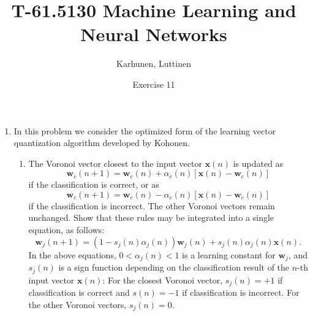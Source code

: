 
\title{T-61.5130 Machine Learning and Neural Networks}
\author{Karhunen, Luttinen}
\date{Exercise 11}

\newcommand{\vect}[1]{{\bf{#1}}}
\newcommand{\svect}[1]{\boldsymbol{#1}}
\newcommand{\matr}[1]{\boldsymbol{#1}}




\maketitle
\thispagestyle{empty}

\begin{enumerate}

\item In this problem we consider the optimized form of the learning
  vector quantization algorithm developed by Kohonen.
  \begin{enumerate}
  \item The Voronoi vector closest to the input vector $\mathbf{x}(n)$
    is updated as
    \begin{equation}
      \mathbf{w}_c(n+1)=\mathbf{w}_c(n)+\alpha_c(n)[\mathbf{x}(n)-\mathbf{w}_c(n)]
      \label{equation: 1}
    \end{equation}
    if the classification is correct, or as
    \begin{equation}
      \mathbf{w}_c(n+1)=\mathbf{w}_c(n)-\alpha_c(n)[\mathbf{x}(n)-\mathbf{w}_c(n)]
      \label{equation: 2}
    \end{equation}
    if the classification is incorrect.  The other Voronoi vectors
    remain unchanged.  Show that these rules may be integrated into a
    single equation, as follows:
    \begin{equation}
      \mathbf{w}_j(n+1) = (1-s_j(n)\alpha_j(n)) \mathbf{w}_j(n) + s_j(n)
      \alpha_j(n) \mathbf{x}(n).
      \label{equation: 3}
    \end{equation}
    In the above equations, $0<\alpha_j(n)<1$ is a learning constant
    for $\mathbf{w}_j$, and $s_j(n)$ is a sign function depending on
    the classification result of the $n$-th input vector
    $\mathbf{x}(n)$: For the closest Voronoi vector, $s_j(n)=+1$ if
    classification is correct and $s(n)=-1$ if classification is
    incorrect.  For the other Voronoi vectors, $s_j(n)=0$.


\end{enumerate}
\end{enumerate}

